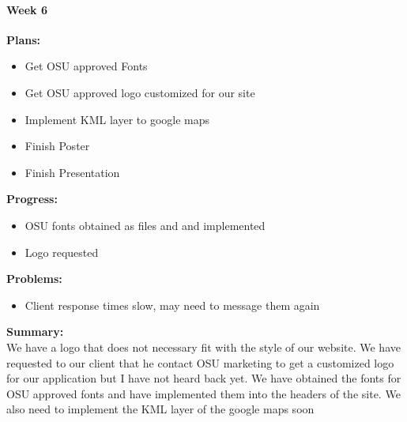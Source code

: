 \paragraph{Week 6}
\begin{adjustwidth}{2.5em}{0pt}
    \vspace{-0.5cm}\textbf{Plans:}
    \vspace{-0.5cm}
    \begin{itemize}
        \item Get OSU approved Fonts
        \item Get OSU approved logo customized for our site
		\item Implement KML layer to google maps
        \item Finish Poster
        \item Finish Presentation
    \end{itemize} 
    \vspace{-0.3cm}\textbf{Progress:}
    \vspace{-0.5cm}
    \begin{itemize}
        \item OSU fonts obtained as files and and implemented 
        \item Logo requested 
    \end{itemize} 
    \vspace{-0.3cm}\textbf{Problems:}
    \vspace{-0.5cm}
    \begin{itemize}
        \item Client response times slow, may need to message them again
    \end{itemize}  
    \vspace{-0.3cm}\noindent\textbf{Summary:}\\
    \noindent We have a logo that does not necessary fit with the style of our website. We have requested to our client that he contact OSU marketing to get a customized logo for our application but I have not heard back yet. We have obtained the fonts for OSU approved fonts and have implemented them into the headers of the site. We also need to implement the KML layer of the google maps soon
\end{adjustwidth} 
